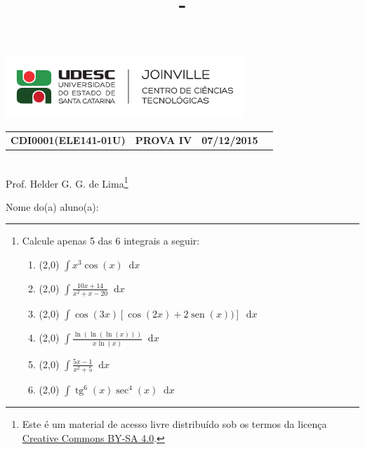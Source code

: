 \documentclass[12pt,a4paper]{article}
\author{\eu}
\title{\tipo - \disciplina}
\date{\data}
\newcommand*\diff{\mathop{}\!\mathrm{d}}
\newcommand*\sen{\operatorname{sen}}
\newcommand*\tg{\operatorname{tg}}
\newcommand*\tipo{PROVA IV}
\newcommand*\turma{ELE141-01U}
\newcommand*\disciplina{CDI0001}
\newcommand*\eu{Helder G. G. de Lima}
\newcommand*\data{07/12/2015}
\begin{document}
\thispagestyle{empty}
\begin{center}
\includegraphics[width=9.0cm]{marca}
\noindent\begin{tabular}{l c c r}
  \textbf{\disciplina (\turma)}
& \textbf{\tipo}
& \textbf{\data}
\end{tabular}
\\ Prof. \eu\footnote{
Este é um material de acesso livre distribuído sob os termos da licença \href{https://creativecommons.org/licenses/by-sa/4.0/deed.pt_BR}{Creative Commons BY-SA 4.0}.}
\end{center}

\noindent Nome do(a) aluno(a): \rule{13cm}{0.01cm}

\begin{center}
\end{center}



\begin{enumerate}

\item Calcule apenas 5 das 6 integrais a seguir:

\begin{enumerate}
\item (2,0) $\displaystyle \int x^3 \cos(x) \diff x$
\item (2,0) $\displaystyle \int \frac{10 x+14}{x^2+x-20} \diff x$
\item (2,0) $\displaystyle \int \cos(3x)\left[ \cos(2x)+2\sen(x)) \right] \diff x$
\item (2,0) $\displaystyle \int \frac{ \ln(\ln(\ln(x))) }{ x \ln(x) } \diff x$
\item (2,0) $\displaystyle \int \frac{5x-1}{x^2+5} \diff x$
\item (2,0) $\displaystyle \int \tg^6(x) \sec^4(x)\diff x$
\end{enumerate}
\end{enumerate}
\end{document}
